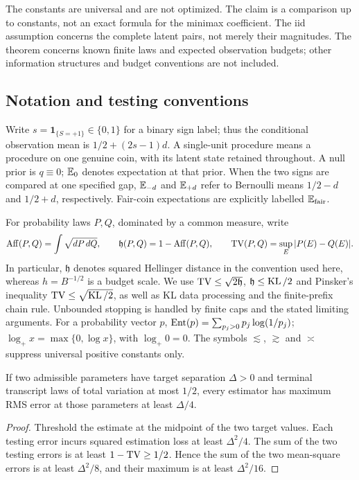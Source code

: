 The constants are universal and are not optimized. The claim is a
comparison up to constants, not an exact formula for the minimax
coefficient. The iid assumption concerns the complete latent pairs,
not merely their magnitudes. The theorem concerns known finite laws
and expected observation budgets; other information structures and
budget conventions are not included.

\subsection{Notation and testing conventions}\label{fg:sec:notation}
Write $s=\mathbf1_{\{S=+1\}}\in\{0,1\}$ for a binary sign label;
thus the conditional observation mean is $1/2+(2s-1)d$. A
single-unit procedure means a procedure on one genuine coin, with
its latent state retained throughout. A null prior is $q\equiv0$;
$\mathbb E_0$ denotes expectation at that prior. When the two signs are
compared at one specified gap, $\mathbb E_{-d}$ and $\mathbb E_{+d}$ refer to
Bernoulli means $1/2-d$ and $1/2+d$, respectively. Fair-coin
expectations are explicitly labelled $\mathbb E_{\rm fair}$.

For probability laws $P,Q$, dominated by a common measure, write
\[
 \operatorname{Aff}(P,Q)=\int\sqrt{dP\,dQ},\qquad
 \mathfrak h(P,Q)=1-\operatorname{Aff}(P,Q),\qquad
 \operatorname{TV}(P,Q)=\sup_E|P(E)-Q(E)|.
\]
In particular, $\mathfrak h$ denotes squared Hellinger distance in
the convention used here, whereas $h=B^{-1/2}$ is a budget scale.
We use $\operatorname{TV}\le\sqrt{2\mathfrak h}$, $\mathfrak h\le\operatorname{KL}/2$ and
Pinsker's inequality $\operatorname{TV}\le\sqrt{\operatorname{KL}/2}$, as well as KL data
processing and the finite-prefix chain rule. Unbounded stopping
is handled by finite caps and the stated limiting arguments.
For a probability vector $p$, $\operatorname{Ent}(p)=\sum_{p_j>0}p_j\log(1/p_j)$;
$\log_+x=\max\{0,\log x\}$, with $\log_+0=0$. The symbols
$\lesssim$, $\gtrsim$ and $\asymp$ suppress universal positive
constants only.

\begin{lemma}\label{fg:lem:two-point}
If two admissible parameters have target separation $\Delta>0$
and terminal transcript laws of total variation at most $1/2$,
every estimator has maximum RMS error at those parameters at
least $\Delta/4$.
\end{lemma}
\begin{proof}
Threshold the estimate at the midpoint of the two target values.
Each testing error incurs squared estimation loss at least
$\Delta^2/4$. The sum of the two testing errors is at least
$1-\operatorname{TV}\ge1/2$. Hence the sum of the two mean-square errors is
at least $\Delta^2/8$, and their maximum is at least $\Delta^2/16$.
\end{proof}
